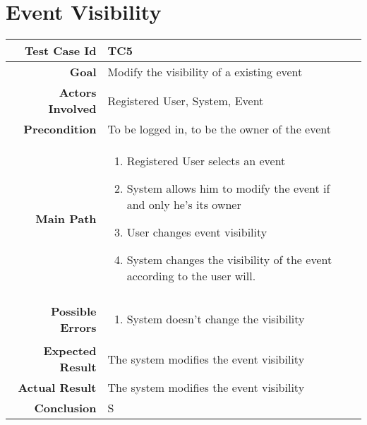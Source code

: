 \section{Event Visibility}
\begin{tabularx}{\linewidth}{|r|X|X|}
\hline   {\bf Test Case Id} &  TC5\\
  \hline  {\bf Goal} & Modify the visibility of a existing event\\
  \hline  {\bf Actors Involved} & Registered User, System, Event\\
  \hline  {\bf Precondition} & To be logged in, to be the owner of the event\\ 
   \hline  {\bf Main Path} & \begin{enumerate} 
   \item Registered User selects an event
   \item System allows him to modify the event if and only he's its owner
   \item User changes event visibility
    \item System changes the visibility of the event according to the user will.
   \end{enumerate}\\
   \hline  {\bf Possible Errors} & \begin{enumerate} 
   \item System doesn't change the visibility
   \end{enumerate}\\
  \hline  {\bf Expected Result} & The system modifies the event visibility\\
  \hline  {\bf Actual Result} & The system modifies the event visibility\\
  \hline  {\bf Conclusion} & S\\
  \hline
  
\end{tabularx}


